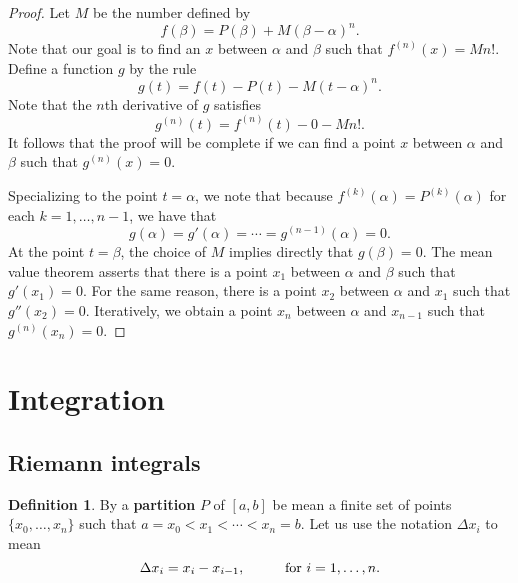 \documentclass[12pt]{article}
\theoremstyle{definition}
\newtheorem{definition}{Definition}
\theoremstyle{theorem}
\begin{document}
\begin{proof}
Let $M$ be the number defined by 
\[
f(\beta) = P(\beta) + M (\beta - \alpha)^n. 
\]
Note that our goal is to find an $x$ between $\alpha$ and $\beta$ such that $f^{(n)}(x) = Mn!$. Define a function $g$ by the rule 
\[
g(t) = f(t) - P(t) - M(t -\alpha)^n.
\]
Note that the $n$th derivative of $g$ satisfies 
\[
g^{(n)}(t) = f^{(n)}(t) - 0 - Mn!.
\]
It follows that the proof will be complete if we can find a point $x$ between $\alpha$ and $\beta$ such that $g^{(n)}(x) = 0$. 

Specializing to the point $t = \alpha$, we note that because $f^{(k)}(\alpha) = P^{(k)}(\alpha)$ for each $k=1, \ldots, n-1$, we have that 
\[
g(\alpha) = g'(\alpha) = \cdots = g^{(n-1)}(\alpha) = 0. 
\]
At the point $t = \beta$, the choice of $M$ implies directly that $g(\beta) = 0$. The mean value theorem asserts that there is a point $x_1$ between $\alpha$ and $\beta$ such that $g'(x_1) = 0$. For the same reason, there is a point $x_2$ between $\alpha$ and $x_1$ such that $g''(x_2) = 0$. Iteratively, we obtain a point $x_n$ between $\alpha$ and $x_{n-1}$ such that $g^{(n)}(x_n) = 0$. 
\end{proof}



\section{Integration}

\subsection{Riemann integrals}

\begin{definition}
By a \textbf{partition} $P$ of $[a,b]$ be mean a finite set of points $\{x_0, \ldots, x_n\}$ such that $a = x_0 < x_1 < \cdots < x_n = b$. Let us use the notation $\Delta x_i$ to mean 
\[
\Delta x_i = x_i - x_{i-1}, \hspace{10mm} \text{for $i = 1, \ldots, n$}. 
\]
\end{definition}
\end{document}
